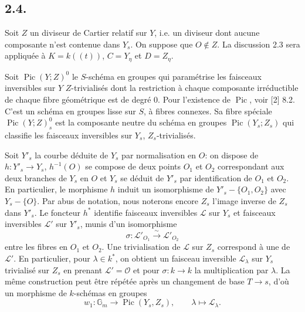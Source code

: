 \documentclass[11pt]{article}
\DeclareMathOperator{\Pic}{Pic}
\newcommand{\OO}{\mathcal O}
\newcommand{\GG}{\mathbb G}
\begin{document}
\subsection*{2.4.}
Soit $Z$ un diviseur de Cartier relatif sur $Y$, i.e. un diviseur dont aucune composante n'est contenue dans $Y_s$. On suppose que $O\notin Z$. La discussion 2.3 sera appliquée à $K=k((t))$, $C=Y_\eta$ et $D=Z_\eta$.

Soit $\Pic(Y;Z)^0$ le $S$-schéma en groupes qui paramétrise les faisceaux inversibles sur $Y$ $Z$-trivialisés dont la restriction à chaque composante irréductible de chaque fibre géométrique est de degré 0. Pour l'existence de $\Pic$, voir [2] 8.2. C'est un schéma en groupes lisse sur $S$, à fibres connexes. Sa fibre spéciale $\Pic(Y;Z)^0_s$ est la composante neutre du schéma en groupes $\Pic(Y_s;Z_s)$ qui classifie les faisceaux inversibles sur $Y_s$, $Z_s$-trivialisés.

Soit $Y'_s$ la courbe déduite de $Y_s$ par normalisation en $O$: on dispose de $h:Y'_s\to Y_s$, $h^{-1}(O)$ se compose de deux points $O_1$ et $O_2$ correspondant aux deux branches de $Y_s$ en $O$ et $Y_s$ se déduit de $Y'_s$ par identification de $O_1$ et $O_2$. En particulier, le morphisme $h$ induit un isomorphisme de $Y'_s-\{O_1,O_2\}$ avec $Y_s-\{O\}$. Par abus de notation, nous noterons encore $Z_s$ l'image inverse de $Z_s$ dans $Y'_s$. Le foncteur $h^*$ identifie faisceaux inversibles $\mathscr L$ sur $Y_s$ et faisceaux inversibles $\mathscr L'$ sur $Y'_s$, munis d'un isomorphisme
\[
        \sigma:\mathscr L'_{O_1}\xrightarrow{\sim}\mathscr L'_{O_2}
\]
entre les fibres en $O_1$ et $O_2$. Une trivialisation de $\mathscr L$ sur $Z_s$ correspond à une de $\mathscr L'$. En particulier, pour $\lambda\in k^*$, on obtient un faisceau inversible $\mathscr L_\lambda$ sur $Y_s$ trivialisé sur $Z_s$ en prenant $\mathscr L'=\OO$ et pour $\sigma:k\to k$ la multiplication par $\lambda$. La même construction peut être répétée après un changement de base $T\to s$, d'où un morphisme de $k$-schémas en groupes
\begin{equation}
        w_1:\GG_m\longrightarrow\Pic(Y_s,Z_s),\qquad
        \lambda\longmapsto\mathscr L_\lambda. \tag{2.4.1}
\end{equation}
\end{document}
